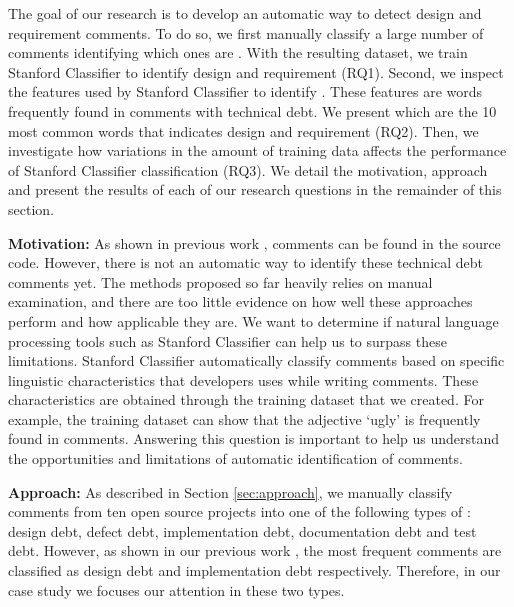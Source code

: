 The goal of our research is to develop an automatic way to detect design and requirement \SATD comments. To do so, we first manually classify a large number of comments identifying which ones are \SATD. With the resulting dataset, we train Stanford Classifier to identify design and requirement \SATD (RQ1). Second, we inspect the features used by Stanford Classifier to identify \SATD. These features are words frequently found in comments with technical debt. We present which are the 10 most common words that indicates design and requirement \SATD (RQ2). Then, we investigate how variations in the amount of training data affects the performance of Stanford Classifier classification (RQ3). We detail the motivation, approach and present the results of each of our research questions in the remainder of this section.    

\vspace{3mm}
\noindent\rqi
\vspace{3mm}

\noindent \textbf{Motivation:} As shown in previous work \cite{Potdar2014ICSME, Maldonado2015MTD}, \SATD comments can be found in the source code. However, there is not an automatic way to identify these technical debt comments yet. The methods proposed so far heavily relies on manual examination, and there are too little evidence on how well these approaches perform and how applicable they are. We want to determine if natural language processing tools such as Stanford Classifier can help us to surpass these limitations. Stanford Classifier automatically classify comments based on specific linguistic characteristics that developers uses while writing comments. These characteristics are obtained through the training dataset that we created. For example, the training dataset can show that the adjective `ugly' is frequently found in \SATD comments. Answering this question is important to help us understand the opportunities and limitations of automatic identification of \SATD comments. 

\vspace{1mm}
\noindent \textbf{Approach:} As described in Section \ref{sec:approach}, we manually classify comments from ten open source projects into one of the following types of \SATD: design debt, defect debt, implementation debt, documentation debt and test debt. However, as shown in our previous work \cite{Maldonado2015MTD}, the most frequent \SATD comments are classified as design debt and implementation debt respectively. Therefore, in our case study we focuses our attention in these two \SATD types. 

